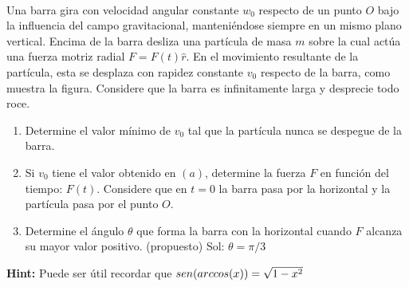 \documentclass[
	spanish, %
	letterpaper, oneside
]{article}
\begin{document}
\templatePagecfg








\\

Una barra gira con velocidad angular constante $w_0$ respecto de un punto $O$ bajo la influencia del campo gravitacional, manteniéndose siempre en un mismo plano vertical. Encima de la barra desliza una partícula de masa $m$ sobre la cual actúa una fuerza motriz radial $F = F(t)\hat r$. En el movimiento resultante de la partícula, esta se desplaza con rapidez constante $v_0$ respecto de la barra, como muestra la figura. Considere que la barra es infinitamente larga y desprecie todo roce.

\begin{enumerate}[label=\alph*)]
    \item Determine el valor mínimo de $v_0$ tal que la partícula nunca se despegue de la barra.
    
    \item Si $v_0$ tiene el valor obtenido en $(a)$, determine la fuerza $F$ en función del tiempo: $F(t)$. Considere que en $t=0$ la barra pasa por la horizontal y la partícula pasa por el punto $O$.
    
    \item Determine el ángulo $\theta$ que forma la barra con la horizontal cuando $F$ alcanza su mayor valor positivo. (propuesto)
    Sol: $\theta = \pi/3$

\end{enumerate}
\textbf{Hint:} Puede ser útil recordar que $sen(arc \space cos(x)) = \sqrt{1 - x^2}$
\end{document}

